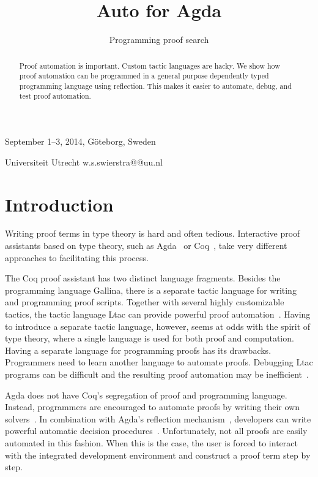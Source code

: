 \documentclass[preprint]{sigplanconf}
\begin{document}
 {September 1--3, 2014, G\"oteborg, Sweden}

\title{Auto for Agda}
\subtitle{Programming proof search}

           {Universiteit Utrecht}
           { \quad w.s.swierstra@@uu.nl}

\maketitle

\begin{abstract}
Proof automation is important. Custom tactic languages are hacky. We
show how proof automation can be programmed in a general purpose
dependently typed programming language using reflection. This makes
it easier to automate, debug, and test proof automation.
\end{abstract}

\section{Introduction}
\label{sec:intro}

Writing proof terms in type theory is hard and often tedious.
Interactive proof assistants based on type theory, such as
Agda~\cite{agda} or Coq~\cite{coq}, take
very different approaches to facilitating this process.

The Coq proof assistant has two distinct language fragments. Besides the
programming language Gallina, there is a separate tactic language for
writing and programming proof scripts. Together with several highly
customizable tactics, the tactic language Ltac can provide powerful
proof automation~\cite{chlipala}. Having to introduce a
separate tactic language, however, seems at odds with the spirit of type
theory, where a single language is used for both proof and computation.
Having a separate language for programming proofs has its
drawbacks. Programmers need to learn another language to automate
proofs. Debugging Ltac programs can be difficult and the resulting
proof automation may be inefficient~\cite{brabaint}.


Agda does not have Coq's segregation of proof and programming language.
Instead, programmers are encouraged to automate proofs by writing their
own solvers~\cite{ulf-tphols}. In combination with
Agda's reflection mechanism~\cite{van-der-walt},
developers can write powerful automatic decision
procedures~\cite{allais}. Unfortunately, not all proofs
are easily automated in this fashion. When this is the case, the user is
forced to interact with the integrated development environment and
construct a proof term step by step.
\end{document}
